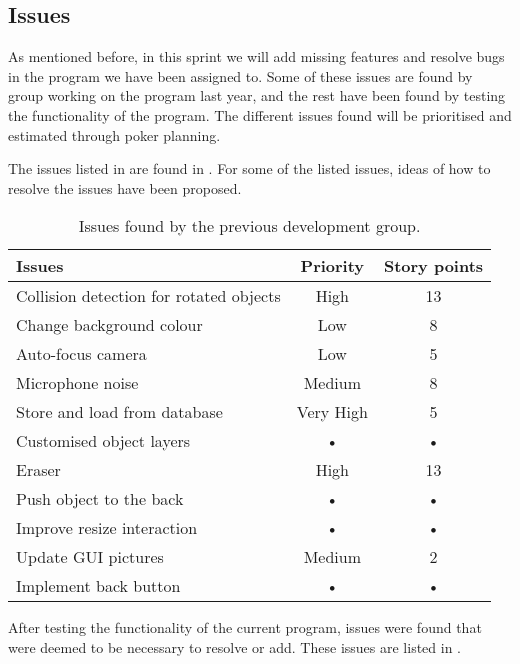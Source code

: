 \subsection{Issues}
As mentioned before, in this sprint we will add missing features and resolve bugs in the program we have been assigned to.
Some of these issues are found by group working on the program last year, and the rest have been found by testing the functionality of the program.
The different issues found will be prioritised and estimated through poker planning.

The issues listed in  are found in .
For some of the listed issues, ideas of how to resolve the issues have been proposed.

\begin{table}[h]
\begin{tabular}{|p{5cm}|c|c|}
\hline 
Issues & Priority & Story points \\ 
\hline 
Collision detection for rotated objects & High & 13 \\ 
\hline 
Change background colour & Low & 8 \\ 
\hline 
Auto-focus camera & Low & 5 \\ 
\hline 
Microphone noise & Medium & 8 \\ 
\hline 
Store and load from database & Very High & 5 \\ 
\hline 
Customised object layers & • & • \\ 
\hline 
Eraser & High & 13 \\ 
\hline 
Push object to the back & • & • \\ 
\hline 
Improve resize interaction & • & • \\ 
\hline 
Update GUI pictures & Medium & 2 \\ 
\hline 
Implement back button & • & • \\ 
\hline 
\end{tabular}
\caption{Issues found by the previous development group.}
\label{table:oldissues}
\end{table}

After testing the functionality of the current program, issues were found that were deemed to be necessary to resolve or add.
These issues are listed in .

